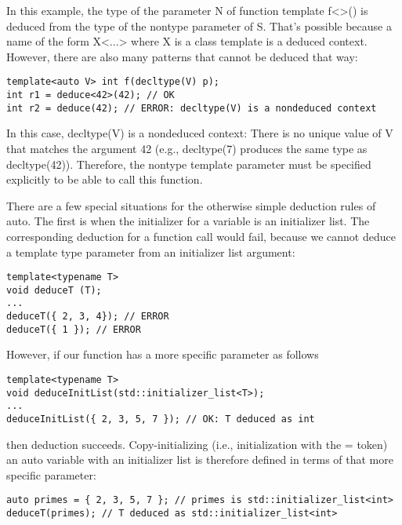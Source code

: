 In this example, the type of the parameter N of function template f<>() is deduced from the type of the nontype parameter of S. That’s possible because a name of the form X<...> where X is a class template is a deduced context. However, there are also many patterns that cannot be deduced that way:

\begin{lstlisting}[style=styleCXX]
template<auto V> int f(decltype(V) p);
int r1 = deduce<42>(42); // OK
int r2 = deduce(42); // ERROR: decltype(V) is a nondeduced context
\end{lstlisting}

In this case, decltype(V) is a nondeduced context: There is no unique value of V that matches the argument 42 (e.g., decltype(7) produces the same type as decltype(42)). Therefore, the nontype template parameter must be specified explicitly to be able to call this function.



There are a few special situations for the otherwise simple deduction rules of auto. The first is when the initializer for a variable is an initializer list. The corresponding deduction for a function call would fail, because we cannot deduce a template type parameter from an initializer list argument:

\begin{lstlisting}[style=styleCXX]
template<typename T>
void deduceT (T);
...
deduceT({ 2, 3, 4}); // ERROR
deduceT({ 1 }); // ERROR
\end{lstlisting}

However, if our function has a more specific parameter as follows

\begin{lstlisting}[style=styleCXX]
template<typename T>
void deduceInitList(std::initializer_list<T>);
...
deduceInitList({ 2, 3, 5, 7 }); // OK: T deduced as int
\end{lstlisting}

then deduction succeeds. Copy-initializing (i.e., initialization with the = token) an auto variable with an initializer list is therefore defined in terms of that more specific parameter:

\begin{lstlisting}[style=styleCXX]
auto primes = { 2, 3, 5, 7 }; // primes is std::initializer_list<int>
deduceT(primes); // T deduced as std::initializer_list<int>
\end{lstlisting}

